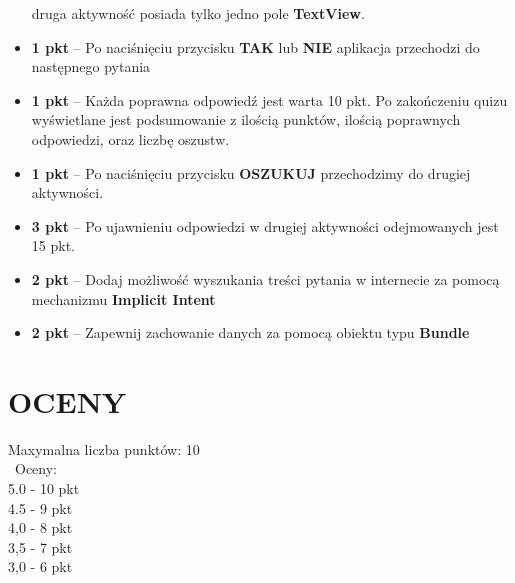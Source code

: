 \documentclass[a4paper]{article}
\begin{document}
\begin{itemize}
druga aktywność posiada tylko jedno pole \textbf{TextView}.

\item \textbf{1 pkt} -- Po naciśnięciu przycisku \textbf{TAK} lub \textbf{NIE} aplikacja przechodzi do następnego pytania

\item \textbf{1 pkt} -- Każda poprawna odpowiedź jest warta 10 pkt. Po zakończeniu quizu wyświetlane jest podsumowanie z ilością punktów, ilością poprawnych odpowiedzi, oraz liczbę oszustw.

\item \textbf{1 pkt} -- Po naciśnięciu przycisku \textbf{OSZUKUJ} przechodzimy do drugiej aktywności.

\item \textbf{3 pkt} -- Po ujawnieniu odpowiedzi w drugiej aktywności odejmowanych jest 15 pkt.

\item \textbf{2 pkt} -- Dodaj możliwość wyszukania treści pytania w internecie za pomocą mechanizmu \textbf{Implicit Intent}

\item \textbf{2 pkt} -- Zapewnij zachowanie danych za pomocą obiektu typu \textbf{Bundle}
\end{itemize}

\section*{OCENY}
Maxymalna liczba punktów: 10\\\
Oceny:\\
5.0 - 10 pkt\\
4.5 - 9 pkt\\
4,0 - 8 pkt\\
3,5 - 7 pkt\\
3,0 - 6 pkt
\end{document}
